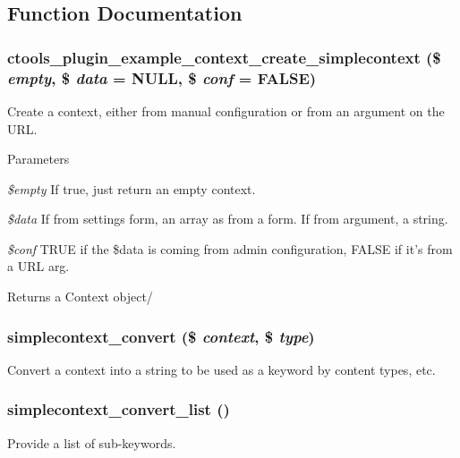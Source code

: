 \subsection{Function Documentation}
\hypertarget{simplecontext_8inc_a557e40ddcf639b68c1ef2b299ab7a4f9}{
\subsubsection[{ctools\_\-plugin\_\-example\_\-context\_\-create\_\-simplecontext}]{\setlength{\rightskip}{0pt plus 5cm}ctools\_\-plugin\_\-example\_\-context\_\-create\_\-simplecontext (\$ {\em empty}, \/  \$ {\em data} = {\ttfamily NULL}, \/  \$ {\em conf} = {\ttfamily FALSE})}}
\label{simplecontext_8inc_a557e40ddcf639b68c1ef2b299ab7a4f9}
Create a context, either from manual configuration or from an argument on the URL.


\begin{DoxyParams}{Parameters}
\item[{\em \$empty}]If true, just return an empty context. \item[{\em \$data}]If from settings form, an array as from a form. If from argument, a string. \item[{\em \$conf}]TRUE if the \$data is coming from admin configuration, FALSE if it's from a URL arg.\end{DoxyParams}
\begin{DoxyReturn}{Returns}
a Context object/ 
\end{DoxyReturn}
\hypertarget{simplecontext_8inc_a3bdaeace35f32bee225e1267fd4c07cd}{
\subsubsection[{simplecontext\_\-convert}]{\setlength{\rightskip}{0pt plus 5cm}simplecontext\_\-convert (\$ {\em context}, \/  \$ {\em type})}}
\label{simplecontext_8inc_a3bdaeace35f32bee225e1267fd4c07cd}
Convert a context into a string to be used as a keyword by content types, etc. \hypertarget{simplecontext_8inc_a8bb1d1c4c119191be2e1de68a2c29842}{
\subsubsection[{simplecontext\_\-convert\_\-list}]{\setlength{\rightskip}{0pt plus 5cm}simplecontext\_\-convert\_\-list ()}}
\label{simplecontext_8inc_a8bb1d1c4c119191be2e1de68a2c29842}
Provide a list of sub-\/keywords.

